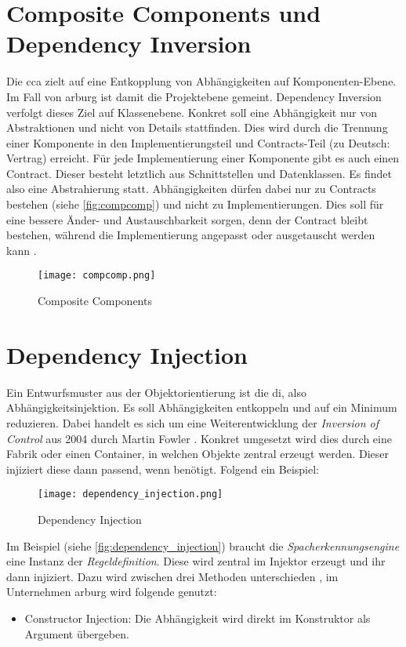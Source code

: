 \section{Composite Components und Dependency Inversion}
\label{sec:compositecomponents}
Die \acrlong{cca} zielt auf eine Entkopplung von Abhängigkeiten auf Komponenten-Ebene. Im Fall von \gls{arburg} ist damit die Projektebene gemeint. Dependency Inversion verfolgt dieses Ziel auf Klassenebene. Konkret soll eine Abhängigkeit nur von Abstraktionen und nicht von Details stattfinden. 
Dies wird durch die Trennung einer Komponente in den Implementierungsteil und Contracts-Teil (zu Deutsch: Vertrag) erreicht. Für jede Implementierung einer Komponente gibt es auch einen Contract. Dieser besteht letztlich aus Schnittstellen und Datenklassen. Es findet also eine Abstrahierung statt. Abhängigkeiten dürfen dabei nur zu Contracts bestehen (siehe \autoref{fig:compcomp}) und nicht zu Implementierungen. Dies soll für eine bessere Änder- und Austauschbarkeit sorgen, denn der Contract bleibt bestehen, während die Implementierung angepasst oder ausgetauscht werden kann \cite{Tielke.2015b}. 

\begin{figure}[!htb] 
	\centering
	\texttt{[image: compcomp.png]}
	\caption{Composite Components}
	\label{fig:compcomp}
\end{figure}
\FloatBarrier

\section{Dependency Injection}
\label{sec:dependencyinjection}
Ein Entwurfsmuster aus der Objektorientierung ist die \gls{di}, also Abhängigkeitsinjektion. Es soll Abhängigkeiten entkoppeln und auf ein Minimum reduzieren. Dabei handelt es sich um eine Weiterentwicklung der \textit{Inversion of Control} aus 2004 durch Martin Fowler \cite{Fowler.2004}. Konkret umgesetzt wird dies durch eine Fabrik oder einen Container, in welchen Objekte zentral erzeugt werden. Dieser injiziert diese dann passend, wenn benötigt. Folgend ein Beispiel:

\begin{figure}[!htb] 
	\centering
	\texttt{[image: dependency\_injection.png]}
	\caption{Dependency Injection}
	\label{fig:dependency_injection}
\end{figure}
\FloatBarrier

Im Beispiel (siehe \autoref{fig:dependency_injection}) braucht die \textit{Spacherkennungsengine} eine Instanz der \textit{Regeldefinition}. Diese wird zentral im Injektor erzeugt und ihr dann injiziert. Dazu wird zwischen drei Methoden unterschieden \cite{Fowler.2004}, im Unternehmen \gls{arburg} wird folgende genutzt:
\begin{itemize}
	\item Constructor Injection: Die Abhängigkeit wird direkt im Konstruktor als Argument übergeben. 
\end{itemize}

